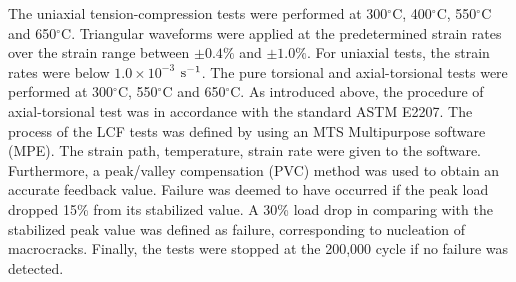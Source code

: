 
The uniaxial tension-compression tests were performed at 300$^\circ$C, 400$^\circ$C, 550$^\circ$C and 650$^\circ$C.
Triangular waveforms were applied at the predetermined strain rates over the strain range between $\pm 0.4\%$ and $\pm 1.0\%$.
For uniaxial tests, the strain rates were below $1.0\times 10^{-3}$ $\rm{s}^{-1}$.
The pure torsional and axial-torsional tests were performed at 300$^\circ$C, 550$^\circ$C and 650$^\circ$C.
As introduced above, the procedure of axial-torsional test was in accordance with the standard ASTM E2207.
The process of the LCF tests was defined by using an MTS Multipurpose software (MPE).
The strain path, temperature, strain rate were given to the software.
Furthermore, a peak/valley compensation (PVC) method was used to obtain an accurate feedback value.
Failure was deemed to have occurred if the peak load dropped 15\% from its stabilized value. A 30\% load drop in comparing with the stabilized peak value was defined as failure, corresponding to nucleation of macrocracks.
Finally, the tests were stopped at the 200,000 cycle if no failure was detected.


